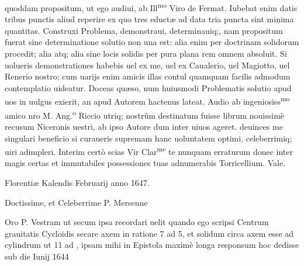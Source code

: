 \documentclass[11pt,a4paper]{article}
\begin{document}
quoddam propositum, ut ego audiui, ab Ill\textsuperscript{mo} Viro de Fermat. Iubebat enim datis tribus punctis aliud reperire ex quo tres eductæ ad data tria puncta sint minima quantitas. Construxi Problema, demonstraui, determinauiq;, nam propositum fuerat sine determinatione solutio non una est: alia enim per doctrinam solidorum procedit; alia atq; alia sine locis solidis per pura plana rem omnem absoluit. Si uolueris demonstrationes habebis uel ex me, uel ex Caualerio, uel Magiotto, uel Renerio nostro; cum uarijs enim amicis illas contul quamquam facilis admodum contemplatio uideatur. Doceas quæso, num huiusmodi Problematis solutio apud uos in uulgus exierit, an apud Autorem hactenus lateat. Audio ab ingeniosiss\textsuperscript{mo} amico nro M. Ang.\textsuperscript{o} Riccio utriq; nostrûm destinatum fuisse librum nouissimè recusum Niceronis uestri, ab ipso Autore dum inter uiuos ageret. deuinces me singulari beneficio si curaueris supremam hanc uoluntatem optimi, celeberrimiq; uiri adimpleri. Interim certò scias Vir Clar\textsuperscript{me} te nunquam erraturum donec inter magis certas et immutabiles possessiones tuas adnumerabis Torricellium. Vale.

Florentiæ Kalendis Februarij anno 1647.


Doctissime, et Celeberrime P. Mersenne

Oro P. Vestram ut secum ipsa recordari uelit quando ego scripsi Centrum grauitatis Cycloidis secare axem in ratione 7 ad 5, et solidum circa axem esse ad cylindrum ut 11 ad , ipsam mihi in Epistola maximè longa responsum hoc dedisse sub die  Iunij 1644
\end{document}
